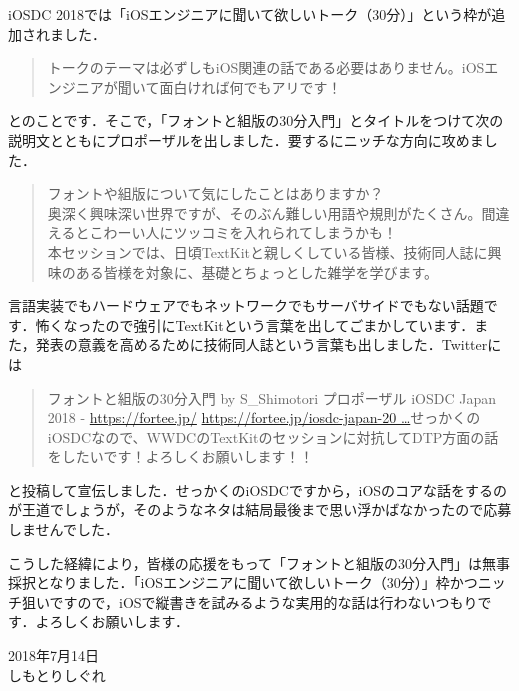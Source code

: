 iOSDC 2018\cite{iosdc.jp:2018}では「iOSエンジニアに聞いて欲しいトーク（30分）」という枠が追加されました．

\begin{quote}
トークのテーマは必ずしもiOS関連の話である必要はありません。iOSエンジニアが聞いて面白ければ何でもアリです！
\end{quote}

\noindent とのことです\cite{fortee.jp:iosdc-japan-2018/speaker/proposal/cfp}．そこで，「フォントと組版の30分入門」とタイトルをつけて次の説明文とともにプロポーザルを出しました\cite{fortee.jp:iosdc-japan-2018/proposal/8e9e8e22-8ff1-4381-813a-347475c2606f}．要するにニッチな方向に攻めました．

\begin{quote}
フォントや組版について気にしたことはありますか？ \\
奥深く興味深い世界ですが、そのぶん難しい用語や規則がたくさん。間違えるとこわーい人にツッコミを入れられてしまうかも！ \\
本セッションでは、日頃TextKitと親しくしている皆様、技術同人誌に興味のある皆様を対象に、基礎とちょっとした雑学を学びます。
\end{quote}

\noindent 言語実装でもハードウェアでもネットワークでもサーバサイドでもない話題です．怖くなったので強引にTextKitという言葉を出してごまかしています．また，発表の意義を高めるために技術同人誌という言葉も出しました．Twitterには

\begin{quote}
\noindent フォントと組版の30分入門 by S\_Shimotori \textbar プロポーザル \textbar iOSDC Japan 2018 - \href{https://t.co/DZDIy0aFCd}{https://fortee.jp/} \href{https://t.co/zvSrclhYoT}{https://fortee.jp/iosdc-japan-20 \ldots}せっかくのiOSDCなので、WWDCのTextKitのセッションに対抗してDTP方面の話をしたいです！よろしくお願いします！！
\end{quote}

\noindent と投稿して宣伝しました\cite{twitter.com:S_Shimotori_pub/status/1008257832863428609}．せっかくのiOSDCですから，iOSのコアな話をするのが王道でしょうが，そのようなネタは結局最後まで思い浮かばなかったので応募しませんでした．

こうした経緯により，皆様の応援をもって「フォントと組版の30分入門」は無事採択となりました．「iOSエンジニアに聞いて欲しいトーク（30分）」枠かつニッチ狙いですので，iOSで縦書きを試みるような実用的な話は行わないつもりです．よろしくお願いします．

\begin{flushright}
2018年7月14日 \\
しもとりしぐれ
\end{flushright}

